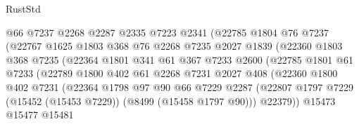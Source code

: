 \begin{lexlean}{RustStd}
\begin{coremodule}
                          @66
                          @7237
                          @2268
                          @2287
                          @2335
                          @7223
                          @2341
                          (@22785
                            @1804
                            @76
                            @7237
                            (@22767
                              @1625
                              @1803
                              @368
                              @76
                              @2268
                              @7235
                              @2027
                              @1839
                              (@22360
                                @1803
                                @368
                                @7235
                                (@22364
                                  @1801
                                  @341
                                  @61
                                  @367
                                  @7233
                                  @2600
                                  (@22785
                                    @1801
                                    @61
                                    @7233
                                    (@22789
                                      @1800
                                      @402
                                      @61
                                      @2268
                                      @7231
                                      @2027
                                      @408
                                      (@22360
                                        @1800
                                        @402
                                        @7231
                                        (@22364
                                          @1798
                                          @97
                                          @90
                                          @66
                                          @7229
                                          @2287
                                          (@22807
                                            @1797
                                            @7229
                                            (@15452 (@15453 @7229))
                                            (@8499 (@15458 @1797 @90)))
                                          @22379))
                                      @15473
                                      @15477
                                      @15481

\end{coremodule}
\end{lexlean}
